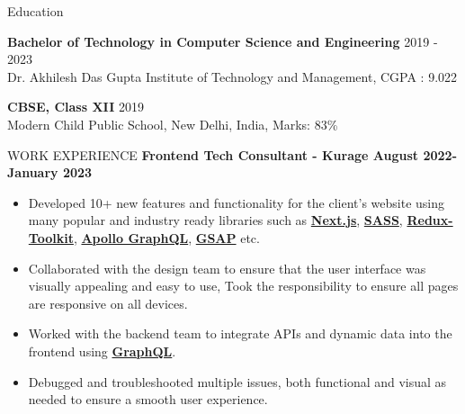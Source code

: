 \documentclass{resume} %
\begin{document}



\begin{rSection}{Education}

{\bf Bachelor of Technology in Computer Science and Engineering} \hfill {2019 - 2023}
\\ 
{\normalfont Dr. Akhilesh Das Gupta Institute of Technology and Management}, {\normalfont CGPA : 9.022} 

{\textbf{CBSE, Class XII}}  \hfill 2019\\
{\normalfont Modern Child Public School, New Delhi, India, {\normalfont Marks: 83\%} } 



\end{rSection}

\begin{rSection}{WORK EXPERIENCE}
{\bf Frontend Tech Consultant - {Kurage}  \hfill August 2022-January 2023 } 
\begin{itemize}
    \item {\normalfont  Developed 10+ new features and functionality for the client's website using many popular and industry ready libraries such as \textbf{\underline{Next.js}}, \textbf{\underline{SASS}}, \textbf{\underline{Redux-Toolkit}}, \textbf{\underline{Apollo GraphQL}}, \textbf{\underline{GSAP}} etc. }
    \item {\normalfont Collaborated with the design team to ensure that the user interface was visually appealing and easy to use, Took the responsibility to ensure all pages are responsive on all devices.} 
   \item {\normalfont Worked with the backend team to integrate APIs and dynamic data into the frontend using \textbf{\underline{GraphQL}}.} 
    \item {\normalfont  Debugged and troubleshooted multiple issues, both functional and visual as needed to ensure a smooth user experience. }
 
   
\end{itemize}
 




\end{rSection}
\end{document}
